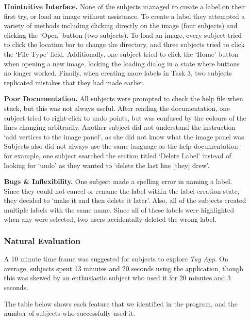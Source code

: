 \documentclass[11pt,twocolumn]{article}
\begin{document}
\textbf{Unintuitive Interface.} None of the subjects managed to create a label on their first try, or load an image without assistance. To create a label they attempted a variety of methods including clicking directly on the image (four subjects) and clicking the `Open' button (two subjects). To load an image, every subject tried to click the location bar to change the directory, and three subjects tried to click the `File Type' field. Additionally, one subject tried to click the `Home' button when opening a new image, locking the loading dialog in a state where buttons no longer worked. Finally, when creating more labels in Task 3, two subjects replicated mistakes that they had made earlier. 

\textbf{Poor Documentation.} All subjects were prompted to check the help file when stuck, but this was not always useful. After reading the documentation, one subject tried to right-click to undo points, but was confused by the colours of the lines changing arbitrarily. Another subject did not understand the instruction `add vertices to the image panel', as she did not know what the
image panel was. Subjects also did not always use the same language as the help documentation - for example, one subject searched the section titled `Delete Label' instead of looking for `undo' as they wanted to `delete the last line [they] drew'.

\textbf{Bugs \& Inflexibility.} One subject made a spelling error in naming a label. Since they could not cancel or rename the label within the label creation state, they decided to `make it and then delete it later'. Also, all of the subjects created multiple labels with the same name. Since all of these labels were highlighted when any were selected, two users accidentally deleted the wrong label.

\subsubsection{Natural Evaluation}

A 10 minute time frame was suggested for subjects to explore \emph{Tag App}. On average, subjects spent 13 minutes and 20 seconds using the application, though this was skewed by an enthusiastic subject who used it for 20 minutes and 3 seconds.

The table below shows each feature that we identified in the program, and the number of subjects who successfully used it.
\end{document}
